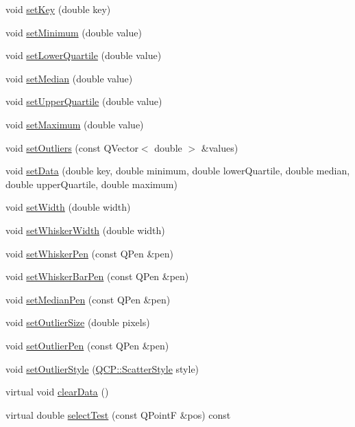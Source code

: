 \begin{DoxyCompactItemize}
\item 
void \hyperlink{classQCPStatisticalBox_a84a1c6d34b2f9af40bca0c527d51e97e}{set\-Key} (double key)
\item 
void \hyperlink{classQCPStatisticalBox_a84ff7cc61ba44890f0c3e0c99c19941e}{set\-Minimum} (double value)
\item 
void \hyperlink{classQCPStatisticalBox_a680941af5e23d902013962fa67223f9e}{set\-Lower\-Quartile} (double value)
\item 
void \hyperlink{classQCPStatisticalBox_a65970e77a897da4ecb4b15300868aad3}{set\-Median} (double value)
\item 
void \hyperlink{classQCPStatisticalBox_a65a1375f941c5a2077b5201229e89346}{set\-Upper\-Quartile} (double value)
\item 
void \hyperlink{classQCPStatisticalBox_acec5ad1901f00f2c5387cfb4d9787eb3}{set\-Maximum} (double value)
\item 
void \hyperlink{classQCPStatisticalBox_af9bc09620e0bf93bf444ee35e5800d1d}{set\-Outliers} (const Q\-Vector$<$ double $>$ \&values)
\item 
void \hyperlink{classQCPStatisticalBox_adf50c57b635edb12470c0e4a986aff37}{set\-Data} (double key, double minimum, double lower\-Quartile, double median, double upper\-Quartile, double maximum)
\item 
void \hyperlink{classQCPStatisticalBox_a0b62775bd67301b1eba5c785f2b26f14}{set\-Width} (double width)
\item 
void \hyperlink{classQCPStatisticalBox_adf378812446bd66f34d1f7f293d991cd}{set\-Whisker\-Width} (double width)
\item 
void \hyperlink{classQCPStatisticalBox_a4a5034cb3b9b040444df05ab1684620b}{set\-Whisker\-Pen} (const Q\-Pen \&pen)
\item 
void \hyperlink{classQCPStatisticalBox_aa8d3e503897788e1abf68dc74b5f147f}{set\-Whisker\-Bar\-Pen} (const Q\-Pen \&pen)
\item 
void \hyperlink{classQCPStatisticalBox_a7260ac55b669f5d0a74f16d5ca84c52c}{set\-Median\-Pen} (const Q\-Pen \&pen)
\item 
void \hyperlink{classQCPStatisticalBox_ae784a5ea2da652e24445d36fbc0b0854}{set\-Outlier\-Size} (double pixels)
\item 
void \hyperlink{classQCPStatisticalBox_ac9079d5e27f1daf4d546f5a21246fc28}{set\-Outlier\-Pen} (const Q\-Pen \&pen)
\item 
void \hyperlink{classQCPStatisticalBox_a1cb2469552f6f6615b1f6d7398463e5c}{set\-Outlier\-Style} (\hyperlink{namespaceQCP_af66d0711d42fe78d96c28abadc67f26f}{Q\-C\-P\-::\-Scatter\-Style} style)
\item 
virtual void \hyperlink{classQCPStatisticalBox_a19112994449df0c20287858436cc68e3}{clear\-Data} ()
\item 
virtual double \hyperlink{classQCPStatisticalBox_acf75fbec885886546ae11ca194ad2aec}{select\-Test} (const Q\-Point\-F \&pos) const 
\end{DoxyCompactItemize}
